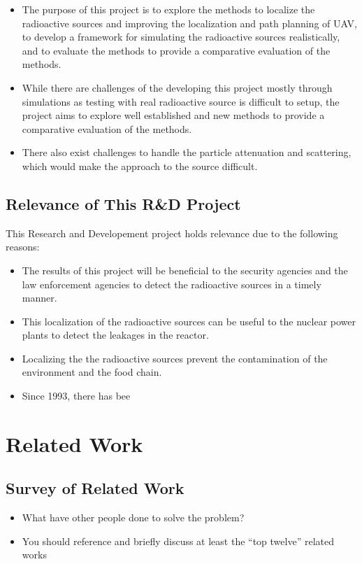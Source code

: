\documentclass[rnd]{mas_proposal}
\begin{document}
\begin{itemize}
    \item The purpose of this project is to explore the methods to localize the radioactive sources and improving the localization and path planning of UAV, to develop a framework for simulating the radioactive sources realistically, and to evaluate the methods to provide a comparative evaluation of the methods.
    \item While there are challenges of the developing this project mostly through simulations as testing with real radioactive source is difficult to setup, the project aims to explore well established and new methods to provide a comparative evaluation of the methods.
    \item There also exist challenges to handle the particle attenuation and scattering, which would make the approach to the source difficult.
\end{itemize}

\subsection{Relevance of This R\&D Project}
This Research and Developement project holds relevance due to the following reasons:
\begin{itemize}
    \item The results of this project will be beneficial to the security agencies and the law enforcement agencies to detect the radioactive sources in a timely manner.
    \item This localization of the radioactive sources can be useful to the nuclear power plants to detect the leakages in the reactor.
    \item Localizing the the radioactive sources prevent the contamination of the environment and the food chain.
    \item Since 1993, there has bee
 \end{itemize}

\section{Related Work}

\subsection{Survey of Related Work}
\begin{itemize}
    \item What have other people done to solve the problem?
    \item You should reference and briefly discuss at least the ``top twelve'' related works
\end{itemize}
\end{document}
